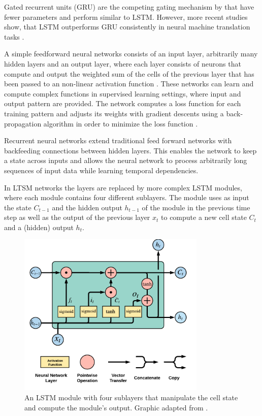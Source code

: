 Gated recurrent units (GRU) \cite{DBLP:conf/emnlp/ChoMGBBSB14} are the competing gating mechanism by \citeauthor{DBLP:conf/emnlp/ChoMGBBSB14} that have fewer parameters and perform similar to LSTM.
However, more recent studies show, that LSTM outperforms GRU consistently in neural machine translation tasks \cite{DBLP:journals/corr/BritzGLL17}.

A simple feedforward neural networks consists of an input layer, arbitrarily many hidden layers and an output layer, where each layer consists of neurons that compute and output the weighted sum of the cells of the previous layer that has been passed to an non-linear activation function \cite{DBLP:journals/nn/Schmidhuber15}.
These networks can learn and compute complex functions in supervised learning settings, where input and output pattern are provided.
The network computes a loss function for each training pattern and adjusts its weights with gradient descents using a back-propagation algorithm in order to minimize the loss function \cite{rumelhart1986learning}.

Recurrent neural networks extend traditional feed forward networks with backfeeding connections between hidden layers.
This enables the network to keep a state across inputs and allows the neural network to process arbitrarily long sequences of input data while learning temporal dependencies.

In LTSM networks the layers are replaced by more complex LSTM modules, where each module contains four different sublayers.
The module uses as input the state $C_{t-1}$ and the hidden output $h_{t-1}$ of the module in the previous time step as well as the output of the previous layer $x_t$ to compute a new cell state $C_{t}$ and a (hidden) output $h_{t}$.

\begin{figure}[htbp!]
	\centering
	\includegraphics[width=0.8\textwidth]{figures/lstm-module}
	\caption{An LSTM module with four sublayers that manipulate the cell state and compute the module's output. Graphic adapted from \cite{lstm-blog}.}
	\label{fig:lstm-module}
\end{figure}

